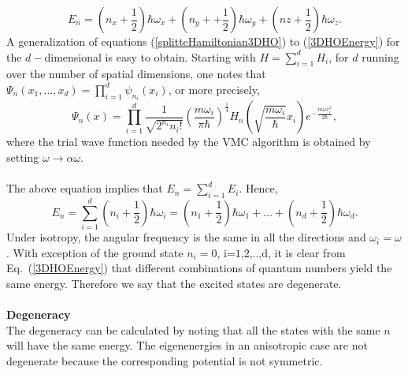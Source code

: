 \begin{equation}\label{3DHOEnergy}
 E_n = \left(n_x + \frac{1}{2}\right) \hbar \omega_x + \left(n_y + + \frac{1}{2}\right) \hbar \omega_y + \left(nz + \frac{1}{2} \right) \hbar \omega_z.
\end{equation}
A generalization of equations (\ref{splitteHamiltonian3DHO}) to (\ref{3DHOEnergy}) for the $d-$dimensional is easy to obtain\cite{Zettili2001}. Starting with $H = \sum_{i=1}^{d} H_i$, for $d$ running over the number of spatial dimensions, one notes that $\Psi_n(x_1, \ldots, x_d) = \prod_{i=1}^{d} \psi_{n_i}(x_i)$, or more precisely,
\begin{equation}\label{dDimensionalHOWF}
 \boxed{\Psi_n(x) = \prod_{i=1}^{d} \frac{1}{\sqrt{2^{n_i} n_i!}} \left(\frac{m \omega_i}{\pi \hbar}\right)^{\frac{1}{4}} H_n\left(\sqrt{\frac{m\omega_i}{\hbar}} x_i \right) e^{-\frac{m\omega x_{i}^2}{2 \hbar}},}
\end{equation}
where the trial wave function needed by the VMC algorithm is obtained by setting $\omega \rightarrow \alpha \omega$.\\
\\
The above equation implies that $E_n =  \sum_{i=1}^{d} E_i$. Hence, 
\begin{equation}\label{generalEHO}
\boxed{E_n = \sum_{i=1}^{d}\left(n_i + \frac{1}{2}\right)\hbar \omega_i = \left(n_1 + \frac{1}{2}\right)\hbar \omega_1 + \ldots + \left(n_{d} + \frac{1}{2}\right)\hbar \omega_d.}
\end{equation}
Under isotropy, the angular frequency is the same in all the directions and $\omega_i = \omega$.
With exception of the ground state $n_i = 0, \,\text{i=1,2,..,d} $, it is clear from Eq.~(\ref{3DHOEnergy}) that different combinations of quantum numbers yield the same energy. Therefore we say that the excited states are degenerate.\\
\\
\noindent
\textbf{Degeneracy}\\
\noindent
The degeneracy can be calculated by noting that all the states with the same $n$ will have the same energy. The eigenenergies in an anisotropic case are not degenerate because the corresponding potential is not symmetric. 
